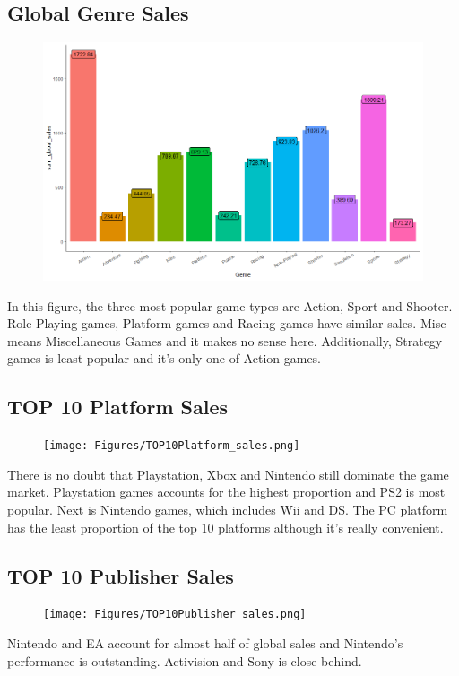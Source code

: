 \documentclass{article}
\begin{document}
	\subsection{Global Genre Sales }
	\begin{figure}[H]
	\centering
	\includegraphics[scale = 0.6]{Figures/Genre_sales.png}
	\end{figure}
	In this figure, the three most popular game types are Action, Sport and Shooter. Role Playing games, Platform games and Racing games have similar sales. Misc means Miscellaneous Games and it makes no sense here. Additionally, Strategy games is least popular and it's only one of Action games.
	
	\subsection{TOP 10 Platform Sales}
	\begin{figure}[H]
	\centering
	\texttt{[image: Figures/TOP10Platform\_sales.png]}
	\end{figure}
	There is no doubt that Playstation, Xbox and Nintendo still dominate the game market. Playstation games accounts for the highest proportion and PS2 is most popular. Next is Nintendo games, which includes Wii and DS. The PC platform has the least proportion of the top 10 platforms although it's really convenient.
	

	\subsection{TOP 10 Publisher Sales}
	\begin{figure}[H]
	\centering
	\texttt{[image: Figures/TOP10Publisher\_sales.png]}
	\end{figure}
	Nintendo and EA account for almost half of global sales and Nintendo's performance is outstanding. Activision and Sony is close behind.
	
\end{document}
